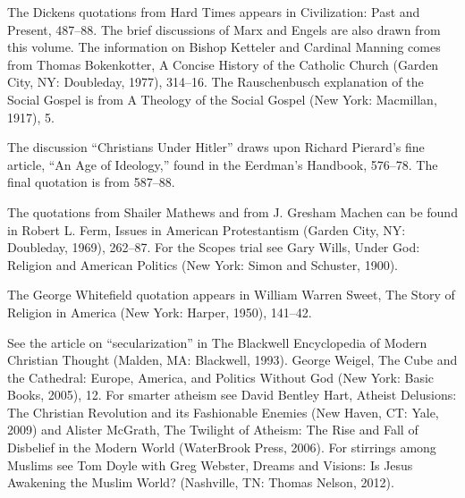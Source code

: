 \begin{notelist}
\entry The Dickens quotations from Hard Times appears in Civilization: Past and Present, 487–88. The
  brief discussions of Marx and Engels are also drawn from this volume.
\entry The information on Bishop Ketteler and Cardinal Manning comes from Thomas Bokenkotter, A
  Concise History of the Catholic Church (Garden City, NY: Doubleday, 1977), 314–16.
\entry The Rauschenbusch explanation of the Social Gospel is from A Theology of the Social Gospel
  (New York: Macmillan, 1917), 5.
\end{notelist}

\begin{notelist}
\entry The discussion “Christians Under Hitler” draws upon Richard Pierard’s fine article, “An Age
  of Ideology,” found in the Eerdman’s Handbook, 576–78. The final quotation is from 587–88.
\end{notelist}

\begin{notelist}
\entry The quotations from Shailer Mathews and from J. Gresham Machen can be found in Robert L.
  Ferm, Issues in American Protestantism (Garden City, NY: Doubleday, 1969), 262–87.
\entry For the Scopes trial see Gary Wills, Under God: Religion and American Politics (New York:
  Simon and Schuster, 1900).
\end{notelist}

\begin{notelist}
\entry The George Whitefield quotation appears in William Warren Sweet, The Story of Religion in
  America (New York: Harper, 1950), 141–42.
\end{notelist}

\begin{notelist}
\entry See the article on “secularization” in The Blackwell Encyclopedia of Modern Christian Thought
  (Malden, MA: Blackwell, 1993).
\entry George Weigel, The Cube and the Cathedral: Europe, America, and Politics Without God (New
  York: Basic Books, 2005), 12.
\entry For smarter atheism see David Bentley Hart, Atheist Delusions: The Christian Revolution and
  its Fashionable Enemies (New Haven, CT: Yale, 2009) and Alister McGrath, The Twilight of Atheism:
  The Rise and Fall of Disbelief in the Modern World (WaterBrook Press, 2006).
\entry For stirrings among Muslims see Tom Doyle with Greg Webster, Dreams and Visions: Is Jesus
  Awakening the Muslim World? (Nashville, TN: Thomas Nelson, 2012).
\end{notelist}

